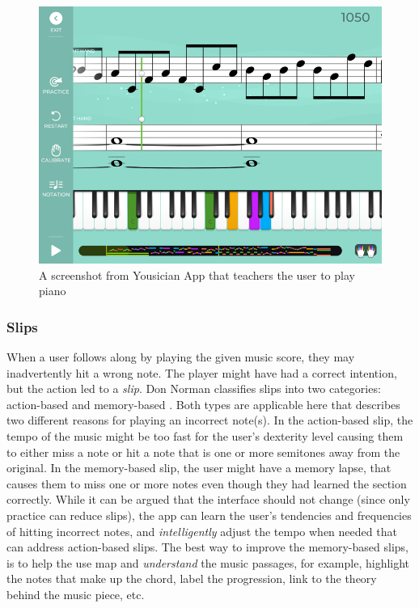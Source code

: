 \documentclass[12pt,letterpaper]{article}
\begin{document}
\begin{figure}[h]
\centering
\includegraphics[scale=.35]{figures/p3/yousician.png}
\caption{A screenshot from Yousician App that teachers the user to play piano}
\label{fig::2}
\end{figure}

\subsubsection*{Slips}
When a user follows along by playing the given music score, they may inadvertently hit a wrong note. The player might have had a correct intention, but the action led to a \textit{slip}. Don Norman classifies slips into two categories: action-based and memory-based \cite{norman2013design}. Both types are applicable here that describes two different reasons for playing an incorrect note(s). In the action-based slip, the tempo of the music might be too fast for the user's dexterity level causing them to either miss a note or hit a note that is one or more semitones away from the original. In the memory-based slip, the user might have a memory lapse, that causes them to miss one or more notes even though they had learned the section correctly. While it can be argued that the interface should not change (since only practice can reduce slips), the app can learn the user's tendencies and frequencies of hitting incorrect notes, and \textit{intelligently} adjust the tempo when needed that can address action-based slips. The best way to improve the memory-based slips, is to help the use map and \textit{understand} the music passages, for example, highlight the notes that make up the chord, label the progression, link to the theory behind the music piece, etc.         
\end{document}
